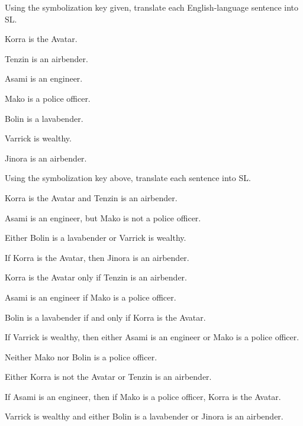 \problempart Using the symbolization key given, translate each English-language sentence into SL.
\begin{ekey} \item[K:] Korra is the Avatar. \item[T:] Tenzin is an airbender. \item[A:] Asami is an engineer. \item[M:] Mako is a police officer. \item[B:] Bolin is a lavabender. \item[V:] Varrick is wealthy. \item[J:] Jinora is an airbender. \end{ekey} Using the symbolization key above, translate each sentence into SL. \begin{earg} \item Korra is the Avatar and Tenzin is an airbender. \item Asami is an engineer, but Mako is not a police officer. \item Either Bolin is a lavabender or Varrick is wealthy. \item If Korra is the Avatar, then Jinora is an airbender. \item Korra is the Avatar only if Tenzin is an airbender. \item Asami is an engineer if Mako is a police officer. \item Bolin is a lavabender if and only if Korra is the Avatar. \item If Varrick is wealthy, then either Asami is an engineer or Mako is a police officer. \item Neither Mako nor Bolin is a police officer. \item Either Korra is not the Avatar or Tenzin is an airbender. \item If Asami is an engineer, then if Mako is a police officer, Korra is the Avatar. \item Varrick is wealthy and either Bolin is a lavabender or Jinora is an airbender. \end{earg}




